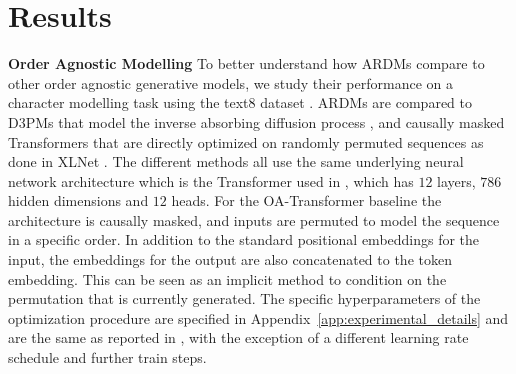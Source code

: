 \documentclass{article} \usepackage{iclr2022_conference,times}
\begin{document}
\section{Results}
\label{sec:results}
\textbf{Order Agnostic Modelling} \hspace{.15cm}
To better understand how ARDMs compare to other order agnostic generative models, we study their performance on a character modelling task using the text8 dataset \citep{mahoney2011large}.
ARDMs are compared to D3PMs that model the inverse absorbing diffusion process \citep{austin2021structured}, and causally masked Transformers that are directly optimized on randomly permuted sequences as done in XLNet \citep{yang2019xlnet}. The different methods all use the same underlying neural network architecture which is the Transformer used in \citep{austin2021structured}, which has $12$ layers, $786$ hidden dimensions and $12$ heads. For the OA-Transformer baseline the architecture is causally masked, and inputs are permuted to model the sequence in a specific order. In addition to the standard positional embeddings for the input, the embeddings for the output are also concatenated to the token embedding. This can be seen as an implicit method to condition on the permutation that is currently generated. The specific hyperparameters of the optimization procedure are specified in Appendix~\ref{app:experimental_details} and are the same as reported in \citep{austin2021structured}, with the exception of a different learning rate schedule and further train steps.
\end{document}
